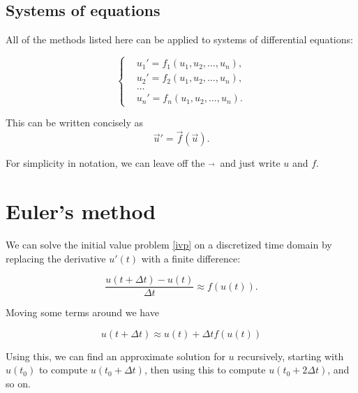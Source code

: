 \documentclass{article}
\newcommand{\dt}{\Delta t}
\begin{document}
\subsection{Systems of equations}

All of the methods listed here can be applied to
systems of differential equations:

\begin{equation}
    \left\{\begin{split}
        &u_1' = f_1(u_1,u_2,\ldots,u_n), \\
        &u_2' = f_2(u_1,u_2,\ldots,u_n), \\
        &\ldots \\
        &u_n' = f_n(u_1,u_2,\ldots,u_n).
    \end{split} \right .
\end{equation}

This can be written concisely as 
\begin{equation}
    \vec{u}' = \vec{f}(\vec{u}).
\end{equation}

For simplicity in notation, we can leave off the $\vec{}\ $ and just write $u$ and $f$.


\section{Euler's method}

We can solve the initial value problem \eqref{ivp} on a discretized time domain by replacing the derivative $u'(t)$ with a finite difference:

\begin{equation}
    \frac{u(t+\dt) - u(t)}{\dt} \approx  f(u(t)).
\end{equation}

Moving some terms around we have

\begin{equation}
    u(t+\dt) \approx u(t) + \dt f(u(t))
    \label{utfeuler}
\end{equation}

Using this, we can find an approximate solution for $u$ recursively,
starting with $u(t_0)$ to compute $u(t_0 + \dt)$,
then using this to compute $u(t_0 + 2\dt)$, and so on.
\end{document}
